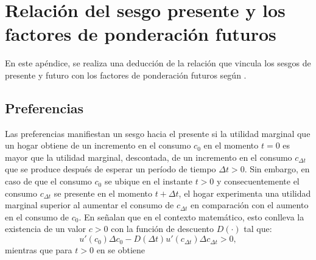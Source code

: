 \chapter{Relación del sesgo presente y los factores de ponderación futuros}\label{Apendice_B}

En este apéndice, se realiza una deducción de la relación que vincula los sesgos de presente y futuro con los factores de ponderación futuros según \parencite{feigenbaum2021deviation}. 

\section{Preferencias}
Las preferencias manifiestan un sesgo hacia el presente si la utilidad marginal que un hogar obtiene de un incremento en el consumo $c_0$ en el momento $t = 0$ es mayor que la utilidad marginal, descontada, de un incremento en el consumo $c_{\Delta t}$ que se produce después de esperar un período de tiempo $\Delta t > 0$.
Sin embargo, en caso de que el consumo $c_0$ se ubique en el instante $t > 0$ y consecuentemente el consumo $c_{\Delta t}$ se presente en el momento $t + \Delta t$, el hogar experimenta una utilidad marginal superior al aumentar el consumo de $c_{\Delta t}$ en comparación con el aumento en el consumo de $c_0$. En \parencite{feigenbaum2021deviation} señalan que en el contexto matemático, esto conlleva la existencia de un valor $c>0$ con la función de descuento $D(\cdot)$ tal que:
%
\begin{equation}\label{1eqbias}
  u'(c_0) \Delta c_0 - D (\Delta t) u'(c_{\Delta t}) \Delta c_{\Delta t}>0,
\end{equation}
%
mientras que para $t>0$ en \parencite{feigenbaum2021deviation} se obtiene 

